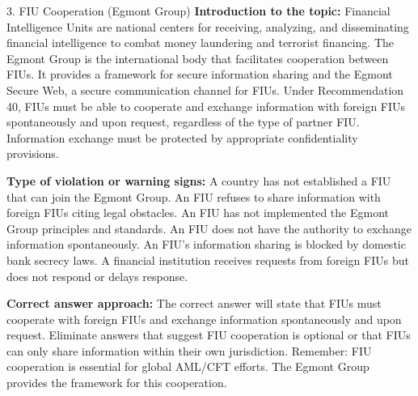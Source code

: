 \documentclass[11pt,a4paper]{beamer}
\begin{document}
\begin{frame}{3. FIU Cooperation (Egmont Group)}
\tiny
\noindent\textbf{Introduction to the topic:} Financial Intelligence Units are national centers for receiving, analyzing, and disseminating financial intelligence to combat money laundering and terrorist financing. The Egmont Group is the international body that facilitates cooperation between FIUs. It provides a framework for secure information sharing and the Egmont Secure Web, a secure communication channel for FIUs. Under Recommendation 40, FIUs must be able to cooperate and exchange information with foreign FIUs spontaneously and upon request, regardless of the type of partner FIU. Information exchange must be protected by appropriate confidentiality provisions.

\vspace{0.1cm}
\noindent\textbf{Type of violation or warning signs:} A country has not established a FIU that can join the Egmont Group. An FIU refuses to share information with foreign FIUs citing legal obstacles. An FIU has not implemented the Egmont Group principles and standards. An FIU does not have the authority to exchange information spontaneously. An FIU's information sharing is blocked by domestic bank secrecy laws. A financial institution receives requests from foreign FIUs but does not respond or delays response.

\vspace{0.1cm}
\noindent\textbf{Correct answer approach:} The correct answer will state that FIUs must cooperate with foreign FIUs and exchange information spontaneously and upon request. Eliminate answers that suggest FIU cooperation is optional or that FIUs can only share information within their own jurisdiction. Remember: FIU cooperation is essential for global AML/CFT efforts. The Egmont Group provides the framework for this cooperation.
\end{frame}
\end{document}
